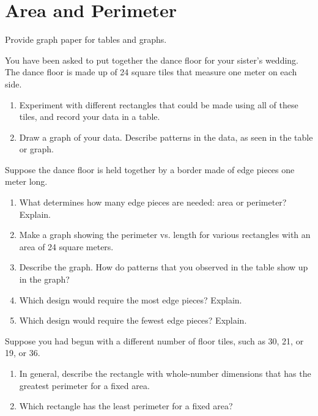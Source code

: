 \newpage

\section{Area and Perimeter}
\begin{teachingnote}
Provide graph paper for tables and graphs.  
\end{teachingnote}

\begin{prob} You have been asked to put together the dance floor for your sister's wedding.  The dance floor is made up of 24 square tiles that measure one meter on each side. 
\begin{enumerate}
\item Experiment with different rectangles that could be made using all of these tiles, and record your data in a table.  
\item Draw a graph of your data.  Describe patterns in the data, as seen in the table or graph.  
\end{enumerate}
\end{prob}

\begin{prob} Suppose the dance floor is held together by a border made of edge pieces one meter long.  
\begin{enumerate}
\item What determines how many edge pieces are needed: area or perimeter?  Explain. 
\item Make a graph showing the perimeter vs. length for various rectangles with an area of 24 square meters.  
\item Describe the graph.  How do patterns that you observed in the table show up in the graph?  
\item Which design would require the most edge pieces?  Explain.  
\item Which design would require the fewest edge pieces?  Explain.
\end{enumerate}
\end{prob}

\begin{prob}
Suppose you had begun with a different number of floor tiles, such as 30, 21, or 19, or 36.  
\begin{enumerate}
\item In general, describe the rectangle with whole-number dimensions that has the greatest perimeter for a fixed area.  
\item Which rectangle has the least perimeter for a fixed area?
\end{enumerate}
\end{prob}

